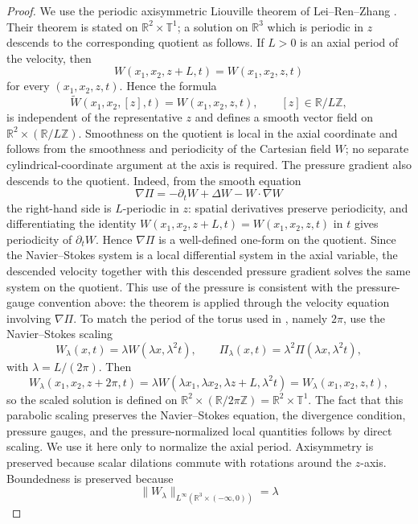 \documentclass[11pt]{amsart}
\theoremstyle{plain}
\theoremstyle{definition}
\theoremstyle{remark}
\numberwithin{equation}{section}
\begin{document}
\begin{proof}
We use the periodic axisymmetric Liouville theorem of Lei--Ren--Zhang
\cite{LRZ2022}.  Their theorem is stated on
\(\mathbb R^2\times\mathbb T^1\); a solution on \(\mathbb R^3\) which is
periodic in \(z\) descends to the corresponding quotient as follows.  If
\(L>0\) is an axial period of the velocity, then
\[
   W(x_1,x_2,z+L,t)=W(x_1,x_2,z,t)
\]
for every \((x_1,x_2,z,t)\).  Hence the formula
\[
   \widetilde W(x_1,x_2,[z],t)=W(x_1,x_2,z,t),
   \qquad [z]\in\mathbb R/L\mathbb Z,
\]
is independent of the representative \(z\) and defines a smooth vector field on
\(\mathbb R^2\times(\mathbb R/L\mathbb Z)\).  Smoothness on the quotient is
local in the axial coordinate and follows from the smoothness and periodicity
of the Cartesian field \(W\); no separate cylindrical-coordinate argument at
the axis is required.  The pressure gradient also descends to the quotient.
Indeed, from the smooth equation
\[
   \nabla\Pi=-\partial_t W+\Delta W-W\cdot\nabla W
\]
the right-hand side is \(L\)-periodic in \(z\): spatial derivatives preserve
periodicity, and differentiating the identity
\(W(x_1,x_2,z+L,t)=W(x_1,x_2,z,t)\) in \(t\) gives periodicity of
\(\partial_tW\).  Hence \(\nabla\Pi\) is a well-defined one-form on the
quotient.  Since the Navier--Stokes system is a local differential system in
the axial variable, the descended velocity together with this descended
pressure gradient solves the same system on the quotient.  This use of the
pressure is consistent with the pressure-gauge convention above: the theorem
is applied through the velocity equation involving \(\nabla\Pi\).  To match the
period of the torus used in \cite{LRZ2022}, namely \(2\pi\), use the
Navier--Stokes scaling
\[
   W_\lambda(x,t)=\lambda W(\lambda x,\lambda^2t),\qquad
   \Pi_\lambda(x,t)=\lambda^2\Pi(\lambda x,\lambda^2t),
\]
with \(\lambda=L/(2\pi)\).  Then
\[
   W_\lambda(x_1,x_2,z+2\pi,t)
   =
   \lambda W(\lambda x_1,\lambda x_2,\lambda z+L,\lambda^2t)
   =
   W_\lambda(x_1,x_2,z,t),
\]
so the scaled solution is defined on
\(\mathbb R^2\times(\mathbb R/2\pi\mathbb Z)=\mathbb R^2\times\mathbb T^1\).
The fact that this parabolic scaling preserves the Navier--Stokes equation, the
divergence condition, pressure gauges, and the pressure-normalized local
quantities follows by direct scaling.  We use it here only to normalize the
axial period.
Axisymmetry is preserved because scalar dilations commute with rotations around
the \(z\)-axis.  Boundedness is preserved because
\[
   \|W_\lambda\|_{L^\infty(\mathbb R^3\times(-\infty,0))}
   =
   \lambda
\]
\end{proof}
\end{document}
